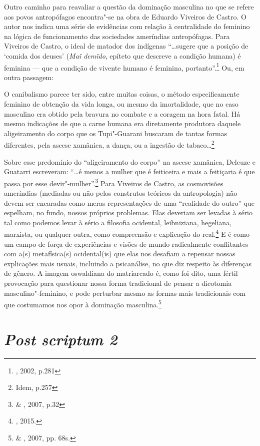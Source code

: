 Outro caminho para reavaliar a questão da dominação masculina no que se
refere aos povos antropófagos encontra"-se na obra de Eduardo Viveiros de
Castro. O autor nos indica uma série de evidências com relação à
centralidade do feminino na lógica de funcionamento das sociedades
ameríndias antropófagas. Para Viveiros de Castro, o ideal de matador dos
indígenas ``\ldots{}sugere que a posição de `comida dos deuses'
(\emph{Maï demïdo}, epíteto que descreve a condição humana) é feminina
--- que a condição de vivente humano é feminina, portanto''.\footnote{, 2002, p.281} Ou, em outra passagem:

O canibalismo parece ter sido, entre muitas coisas, o método
especificamente feminino de obtenção da vida longa, ou mesmo da
imortalidade, que no caso masculino era obtido pela bravura no combate e
a coragem na hora fatal. Há mesmo indicações de que a carne humana era
diretamente produtora daquele aligeiramento do corpo que os Tupi"-Guarani
buscaram de tantas formas diferentes, pela ascese xamânica, a dança, ou
a ingestão de tabaco\ldots{}\footnote{Idem, p.257}

Sobre esse predomínio do ``aligeiramento do corpo'' na ascese xamânica,
Deleuze e Guatarri escreveram: ``\ldots{}é menos a mulher que é
feiticeira e mais a feitiçaria é que passa por esse
devir"-mulher''.\footnote{ \& , 2007, p.32} Para Viveiros
de Castro, as cosmovisões ameríndias (mediadas ou não pelos construtos
teóricos da antropologia) não devem ser encaradas como meras
representações de uma ``realidade do outro'' que espelham, no fundo,
nossos próprios problemas. Elas deveriam ser levadas à sério tal como
podemos levar à sério a filosofia ocidental, leibniziana, hegeliana,
marxista, ou qualquer outra, como compreensão e explicação do
real.\footnote{, 2015.} E é como um campo de força de
experiências e visões de mundo radicalmente conflitantes com a(s)
metafísica(s) ocidental(is) que elas nos desafiam a repensar nossas
explicações mais usuais, incluindo a psicanálise, no que diz respeito às
diferenças de gênero. A imagem oswaldiana do matriarcado é, como foi
dito, uma fértil provocação para questionar nossa forma tradicional de
pensar a dicotomia masculino"-feminino, e pode perturbar mesmo as formas
mais tradicionais com que costumamos nos opor à dominação
masculina.\footnote{ \& , 2007, pp. 68s.}

\section{\emph{Post scriptum 2}}

